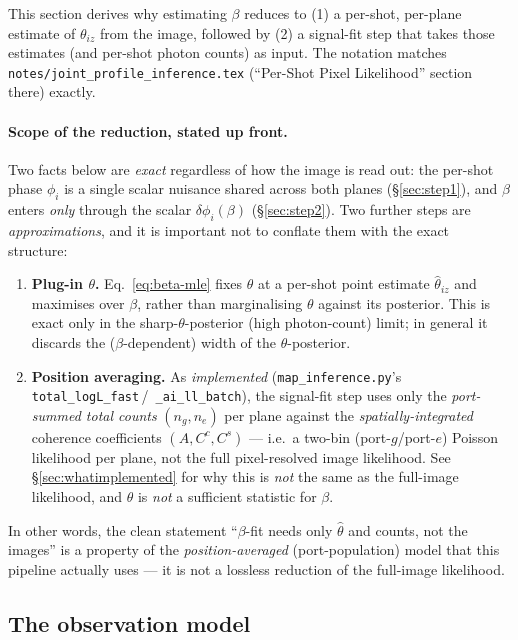 \documentclass[11pt,a4paper]{article}
\newcommand{\code}[1]{\texttt{#1}}
\begin{document}
This section derives why estimating $\beta$ reduces to (1) a per-shot,
per-plane estimate of $\theta_{iz}$ from the image, followed by (2) a
signal-fit step that takes those estimates (and per-shot photon counts) as
input. The notation matches \code{notes/joint\_profile\_inference.tex}
(``Per-Shot Pixel Likelihood'' section there) exactly.

\paragraph{Scope of the reduction, stated up front.} Two facts below are
\emph{exact} regardless of how the image is read out: the per-shot phase
$\phi_i$ is a single scalar nuisance shared across both planes
(\S\ref{sec:step1}), and $\beta$ enters \emph{only} through the scalar
$\delta\phi_i(\beta)$ (\S\ref{sec:step2}). Two further steps are
\emph{approximations}, and it is important not to conflate them with the
exact structure:
\begin{enumerate}
  \item \textbf{Plug-in $\theta$.} Eq.~\ref{eq:beta-mle} fixes $\theta$ at a
    per-shot point estimate $\hat\theta_{iz}$ and maximises over $\beta$,
    rather than marginalising $\theta$ against its posterior. This is exact
    only in the sharp-$\theta$-posterior (high photon-count) limit; in
    general it discards the ($\beta$-dependent) width of the
    $\theta$-posterior.
  \item \textbf{Position averaging.} As \emph{implemented}
    (\code{map\_inference.py}'s \code{total\_logL\_fast}\,/\,%
    \code{\_ai\_ll\_batch}), the signal-fit step uses only the
    \emph{port-summed total counts} $(n_g,n_e)$ per plane against the
    \emph{spatially-integrated} coherence coefficients $(A,C^c,C^s)$ --- i.e.\
    a two-bin (port-$g$/port-$e$) Poisson likelihood per plane, not the full
    pixel-resolved image likelihood. See \S\ref{sec:whatimplemented} for why
    this is \emph{not} the same as the full-image likelihood, and $\hat\theta$
    is \emph{not} a sufficient statistic for $\beta$.
\end{enumerate}
In other words, the clean statement ``$\beta$-fit needs only $\hat\theta$ and
counts, not the images'' is a property of the \emph{position-averaged}
(port-population) model that this pipeline actually uses --- it is not a
lossless reduction of the full-image likelihood.

\subsection{The observation model}
\end{document}
